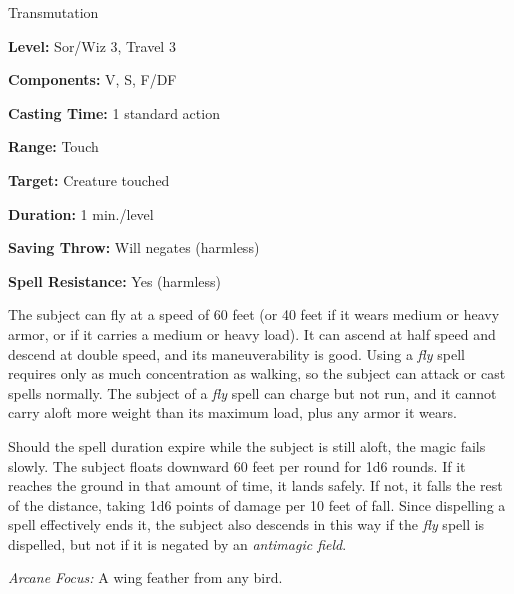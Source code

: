 
Transmutation

\textbf{Level:} Sor/Wiz 3, Travel 3

\textbf{Components:} V, S, F/DF

\textbf{Casting Time:} 1 standard action

\textbf{Range:} Touch

\textbf{Target:} Creature touched

\textbf{Duration:} 1 min./level

\textbf{Saving Throw:} Will negates (harmless)

\textbf{Spell Resistance:} Yes (harmless)

The subject can fly at a speed of 60 feet (or 40 feet if it wears medium or heavy 
armor, or if it carries a medium or heavy load). It can ascend at half speed and 
descend at double speed, and its maneuverability is good. Using a \textit{fly} spell 
requires only as much concentration as walking, so the subject can attack or cast 
spells normally. The subject of a \textit{fly} spell can charge but not run, and 
it cannot carry aloft more weight than its maximum load, plus any armor it wears.

Should the spell duration expire while the subject is still aloft, the magic fails 
slowly. The subject floats downward 60 feet per round for 1d6 rounds. If it reaches 
the ground in that amount of time, it lands safely. If not, it falls the rest of 
the distance, taking 1d6 points of damage per 10 feet of fall. Since dispelling 
a spell effectively ends it, the subject also descends in this way if the \textit{fly 
}spell is dispelled, but not if it is negated by an \textit{antimagic field}.

\textit{Arcane Focus:} A wing feather from any bird.

